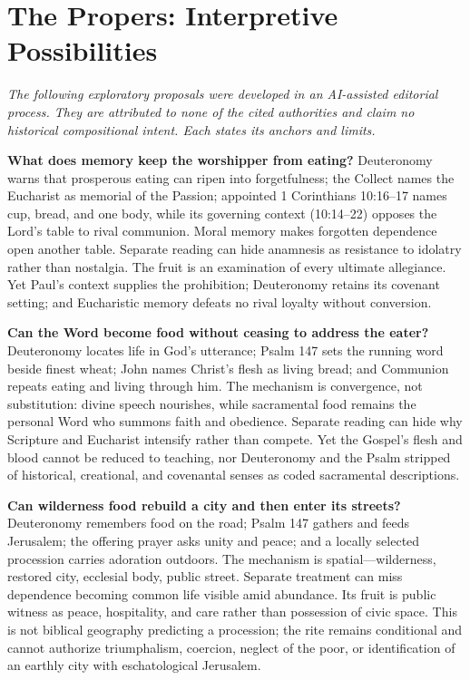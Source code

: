 \section*{The Propers: Interpretive Possibilities}

\noindent\emph{The following exploratory proposals were developed in an AI-assisted editorial process. They are attributed to none of the cited authorities and claim no historical compositional intent. Each states its anchors and limits.}

\noindent\textbf{What does memory keep the worshipper from eating?\enspace{}}
Deuteronomy warns that prosperous eating can ripen into forgetfulness; the Collect names the Eucharist as memorial of the Passion; appointed 1 Corinthians 10:16--17 names cup, bread, and one body, while its governing context (10:14--22) opposes the Lord's table to rival communion. Moral memory makes forgotten dependence open another table. Separate reading can hide anamnesis as resistance to idolatry rather than nostalgia. The fruit is an examination of every ultimate allegiance. Yet Paul's context supplies the prohibition; Deuteronomy retains its covenant setting; and Eucharistic memory defeats no rival loyalty without conversion.

\noindent\textbf{Can the Word become food without ceasing to address the eater?\enspace{}}
Deuteronomy locates life in God's utterance; Psalm 147 sets the running word beside finest wheat; John names Christ's flesh as living bread; and Communion repeats eating and living through him. The mechanism is convergence, not substitution: divine speech nourishes, while sacramental food remains the personal Word who summons faith and obedience. Separate reading can hide why Scripture and Eucharist intensify rather than compete. Yet the Gospel's flesh and blood cannot be reduced to teaching, nor Deuteronomy and the Psalm stripped of historical, creational, and covenantal senses as coded sacramental descriptions.

\noindent\textbf{Can wilderness food rebuild a city and then enter its streets?\enspace{}}
Deuteronomy remembers food on the road; Psalm 147 gathers and feeds Jerusalem; the offering prayer asks unity and peace; and a locally selected procession carries adoration outdoors. The mechanism is spatial---wilderness, restored city, ecclesial body, public street. Separate treatment can miss dependence becoming common life visible amid abundance. Its fruit is public witness as peace, hospitality, and care rather than possession of civic space. This is not biblical geography predicting a procession; the rite remains conditional and cannot authorize triumphalism, coercion, neglect of the poor, or identification of an earthly city with eschatological Jerusalem.

